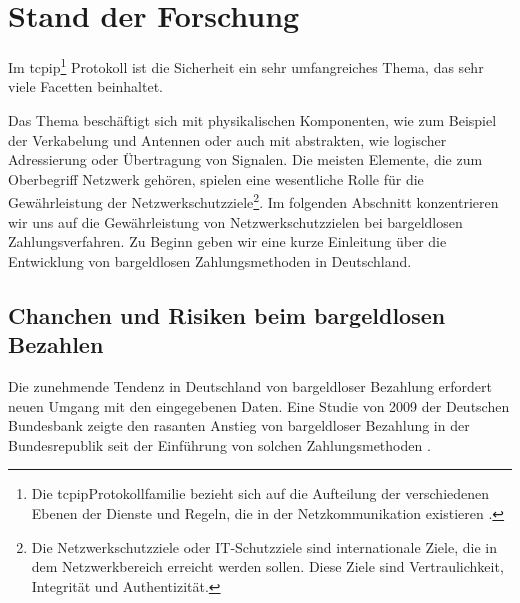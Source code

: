 \section{Stand der Forschung}

Im \acrfull{tcpip}\footnote{Die \acrshort{tcpip}Protokollfamilie bezieht sich auf die Aufteilung 
der verschiedenen Ebenen der Dienste und Regeln, die in der Netzkommunikation existieren \cite{refbook:SWIS}.} Protokoll ist 
die Sicherheit ein sehr umfangreiches Thema, das sehr viele Facetten beinhaltet. 


Das Thema beschäftigt sich mit physikalischen 
Komponenten, wie zum Beispiel der Verkabelung und Antennen oder auch mit abstrakten, wie logischer Adressierung oder 
Übertragung von Signalen. Die meisten Elemente, die zum Oberbegriff Netzwerk gehören, spielen eine wesentliche Rolle 
für die Gewährleistung der Netzwerkschutzziele\footnote{Die Netzwerkschutzziele oder IT-Schutzziele sind internationale
Ziele, die in dem Netzwerkbereich erreicht werden sollen. Diese Ziele sind Vertraulichkeit, Integrität und 
Authentizität.}. Im folgenden Abschnitt konzentrieren wir uns auf die Gewährleistung von Netzwerkschutzzielen
bei bargeldlosen Zahlungsverfahren. Zu Beginn geben wir eine kurze Einleitung über die Entwicklung von bargeldlosen
Zahlungsmethoden in Deutschland.


\subsection{Chanchen und Risiken beim bargeldlosen Bezahlen}

Die zunehmende Tendenz in Deutschland von bargeldloser Bezahlung erfordert neuen Umgang mit den eingegebenen Daten. 
Eine Studie von 2009 der Deutschen Bundesbank zeigte den rasanten Anstieg von bargeldloser Bezahlung in der
Bundesrepublik seit der Einführung von solchen Zahlungsmethoden \cite{refrep:DBCP}.

